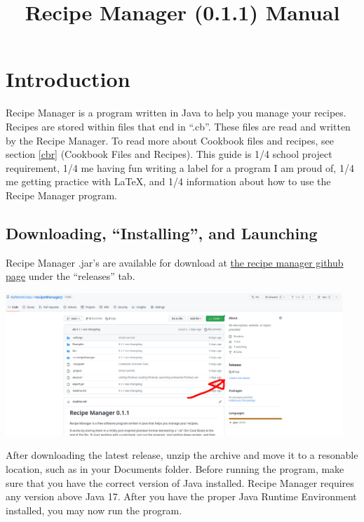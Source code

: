 \documentclass{article}
\title{Recipe Manager (0.1.1) Manual}
\author{}
\date{}
\begin{document}
\maketitle{}

\section{Introduction\label{intro}}

Recipe Manager is a program written in Java to help you manage your
recipes. Recipes are stored within files that end in ``.cb''. These
files are read and written by the Recipe Manager. To read more about
Cookbook files and recipes, see section \ref{cbr} (Cookbook Files and
Recipes).
This guide is 1/4 school project requirement, 1/4 me having fun
writing a label for a program I am proud of, 1/4 me getting practice
with \LaTeX{}, and 1/4 information about
how to use the Recipe Manager program.

\subsection{Downloading, ``Installing'', and Launching\label{downld}}

Recipe Manager .jar's are available for download at
\href{https://github.com/AshtonCross/recipeManagerJ}{the recipe
  manager github page} under the ``releases'' tab.

\begin{center}
\includegraphics[width=5in]{img/releases.png}
\end{center}

After downloading the latest release, unzip the archive and move it to
a resonable location, such as in your Documents folder. Before running
the program, make sure that you have the correct version of Java
installed. Recipe Manager requires any version above Java 17. After
you have the proper Java Runtime Environment installed, you may now
run the program. 
\end{document}
